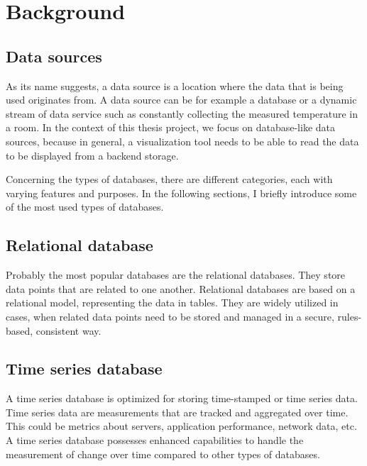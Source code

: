 \chapter{Background}

\section{Data sources}


As its name suggests, a data source is a location where the data that is being used originates from. A data source can be for example a database or a dynamic stream of data service such as constantly collecting the measured temperature in a room. In the context of this thesis project, we focus on database-like data sources, because in general, a visualization tool needs to be able to read the data to be displayed from a backend storage. \cite{talend-datasource} \cite{techopedia-datasource}

Concerning the types of databases, there are different categories, each with varying features and purposes. In the following sections, I briefly introduce some of the most used types of databases.

\section{Relational database}

Probably the most popular databases are the relational databases. They store data points that are related to one another. Relational databases are based on a relational model, representing the data in tables. They are widely utilized in cases, when related data points need to be stored and managed in a secure, rules-based, consistent way. \cite{relational-database-oracle}

\section{Time series database}


A time series database is optimized for storing time-stamped or time series data. Time series data are measurements that are tracked and aggregated over time. This could be metrics about servers, application performance, network data, etc. A time series database possesses enhanced capabilities to handle the measurement of change over time compared to other types of databases. \cite{timeseries-database-influxdata}

